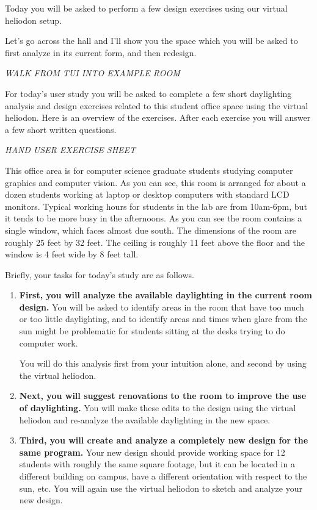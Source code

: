 \documentclass[12pt]{article}
\begin{document}
Today you will be asked to perform a few design exercises using our
virtual heliodon setup.  

Let's go across the hall and I'll show you the space which you will be
asked to first analyze in its current form, and then redesign.

{\em WALK FROM TUI INTO EXAMPLE ROOM }

For today's user study you will be asked to complete a few short
daylighting analysis and design exercises related to this student
office space using the virtual heliodon.  Here is an overview of the
exercises.  After each exercise you will answer a few short written
questions.

{\em HAND USER EXERCISE SHEET }

This office area is for computer science graduate students studying
computer graphics and computer vision.  As you can see, this room is
arranged for about a dozen students working at laptop or desktop
computers with standard LCD monitors.  Typical working hours for
students in the lab are from 10am-6pm, but it tends to be more busy in
the afternoons.  As you can see the room contains a single window,
which faces almost due south.  The dimensions of the room are roughly
25 feet by 32 feet.  The ceiling is roughly 11 feet above the floor
and the window is 4 feet wide by 8 feet tall.

\newpage 

Briefly, your tasks for today's study are as follows. 

\begin{enumerate}
\item {\bf First, you will analyze the available daylighting in the
  current room design.}  You will be asked to identify areas in the
  room that have too much or too little daylighting, and to identify
  areas and times when glare from the sun might be problematic for
  students sitting at the desks trying to do computer work.

   You will do this analysis first from your intuition alone, and
   second by using the virtual heliodon.

\item {\bf Next, you will suggest renovations to the room to improve
  the use of daylighting.}  You will make these edits to the design
  using the virtual heliodon and re-analyze the available daylighting
  in the new space.

\item {\bf Third, you will create and analyze a completely new design
  for the same program. } Your new design should provide working space
  for 12 students with roughly the same square footage, but it can be
  located in a different building on campus, have a different
  orientation with respect to the sun, etc.  You will again use the
  virtual heliodon to sketch and analyze your new design.

\end{enumerate}
\end{document}
